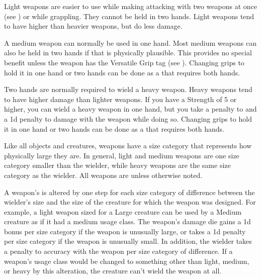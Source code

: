             \label{Light Weapons} Light weapons are easier to use while making attacking with two weapons at once (see ) or while grappling.
            They cannot be held in two hands.
            Light weapons tend to have higher  than heavier weapons, but do less damage.

             A medium weapon can normally be used in one hand.
            Most medium weapons can also be held in two hands if that is physically plausible.
            This provides no special benefit unless the weapon has the Versatile Grip tag (see ).
            Changing grips to hold it in one hand or two hands can be done as a  that requires both hands.

             Two hands are normally required to wield a heavy weapon.
            Heavy weapons tend to have higher damage than lighter weapons.
            If you have a Strength of 5 or higher, you can wield a heavy weapon in one hand, but you take a  penalty to  and a \minus1d penalty to damage with the weapon while doing so.
            Changing grips to hold it in one hand or two hands can be done as a  that requires both hands.

             Like all objects and creatures, weapons have a size category that represents how physically large they are. In general, light and medium weapons are one size category smaller than the wielder, while heavy weapons are the same size category as the wielder.
            All weapons are  unless otherwise noted.

            \label{Inappropriately Sized Weapons} A weapon's  is altered by one step for each size category of difference between the wielder's size and the size of the creature for which the weapon was designed.
            For example, a light weapon sized for a Large creature can be used by a Medium creature as if it had a medium usage class.
            The weapon's damage die gains a \plus1d bonus per size category if the weapon is unusually large, or takes a \minus1d penalty per size category if the weapon is unusually small.
            In addition, the wielder takes a  penalty to accuracy with the weapon per size category of difference.
            If a weapon's usage class would be changed to something other than light, medium, or heavy by this alteration, the creature can't wield the weapon at all.


